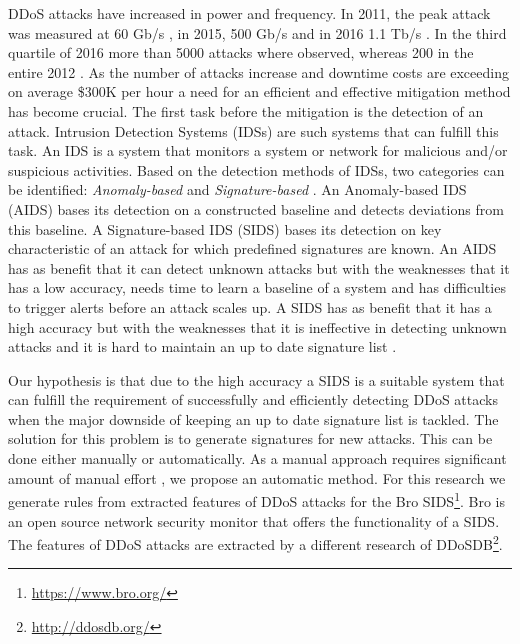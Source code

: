 DDoS attacks have increased in power and frequency. In 2011, the peak attack was measured at 60 Gb/s \cite{Arbor2014}, in 2015, 500 Gb/s and in 2016 1.1 Tb/s \cite{Akamai2017}. In the third quartile of 2016 more than 5000 attacks where observed, whereas 200 in the entire 2012 \cite{Akamai2016}. As the number of attacks increase and downtime costs are exceeding on average \$300K per hour \cite{ITIC2016} a need for an efficient and effective mitigation method has become crucial. The first task before the mitigation is the detection of an attack. Intrusion Detection Systems (IDSs) are such systems that can fulfill this task. An IDS is a system that monitors a system or network for malicious and/or suspicious activities. 
Based on the detection methods of IDSs, two categories can be identified: \textit{Anomaly-based} and \textit{Signature-based} \cite{fragkiadakis2015anomaly}. An Anomaly-based IDS (AIDS) bases its detection on a constructed baseline and detects deviations from this baseline. A Signature-based IDS (SIDS) bases its detection on key characteristic of an attack for which predefined signatures are known. An AIDS has as benefit that it can detect unknown attacks but with the weaknesses that it has a low accuracy, needs time to learn a baseline of a system and has difficulties to trigger alerts before an attack scales up. A SIDS has as benefit that it has a high accuracy but with the weaknesses that it is ineffective in detecting unknown attacks and it is hard to maintain an up to date signature list \cite{Liao2013}. 

Our hypothesis is that due to the high accuracy a SIDS is a suitable system that can fulfill the requirement of successfully and efficiently detecting DDoS attacks when the major downside of keeping an up to date signature list is tackled. The solution for this problem is to generate signatures for new attacks. This can be done either manually or automatically. As a manual approach requires significant amount of manual effort \cite{Lin2013}, we propose an automatic method. For this research we generate rules from extracted features of DDoS attacks for the Bro SIDS\footnote{\url{https://www.bro.org/}}. Bro is an open source network security monitor that offers the functionality of a SIDS. The features of DDoS attacks are extracted by a different research of DDoSDB\footnote{\url{http://ddosdb.org/}}.

